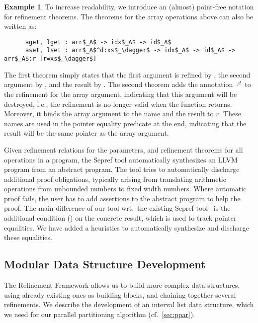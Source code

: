 \documentclass[sn-mathphys,Numbered]{sn-jnl}
\theoremstyle{thmstyleone}%
\theoremstyle{definition}%
\newtheorem{example}{Example}%
\theoremstyle{thmstylethree}%
\begin{document}
\begin{example}
    To increase readability, we introduce an (almost) point-free notation for refinement theorems.
    The theorems for the array operations above can also be written as:
    \begin{lstlisting}
      aget, lget : arr$_A$ -> idx$_A$ -> id$_A$
      aset, lset : arr$_A$^d:xs$_\dagger$ -> idx$_A$ -> id$_A$ -> arr$_A$:r [r=xs$_\dagger$]
    \end{lstlisting}
    The first theorem simply states that the first argument is refined by ,
    the second argument by , and the result by .
    The second theorem adds the annotation $\cdot^d$ to the refinement for the array argument,
    indicating that this argument will be destroyed, i.e., the refinement is no longer valid when the function returns.
    Moreover, it binds the array argument to the name  and the result to $r$. These names are used in the pointer equality predicate \is{[r=xs$_\dagger$]}
    at the end, indicating that the result will be the same pointer as the array argument.




  \end{example}

  Given refinement relations for the parameters, and refinement theorems for all operations in a program,
  the Sepref tool automatically synthesizes an LLVM program from an abstract  program.
  The tool tries to automatically discharge additional proof obligations, typically arising from
  translating arithmetic operations from unbounded numbers to fixed width numbers. Where automatic proof fails,
  the user has to add assertions to the abstract program to help the proof.
  The main difference of our tool wrt.\ the existing Sepref tool~\cite{La19-llvm} is the additional
  condition () on the concrete result, which is used to track pointer equalities.
  We have added a heuristics to automatically synthesize and discharge these equalities.

  \subsection{Modular Data Structure Development}\label{sec:mod_ds}
  The Refinement Framework allows us to build more complex data structures, using already existing ones as building blocks,
  and chaining together several refinements.
  We describe the development of an interval list data structure, which we need for our parallel partitioning algorithm (cf.~\ref{sec:ppar}).
\end{document}

